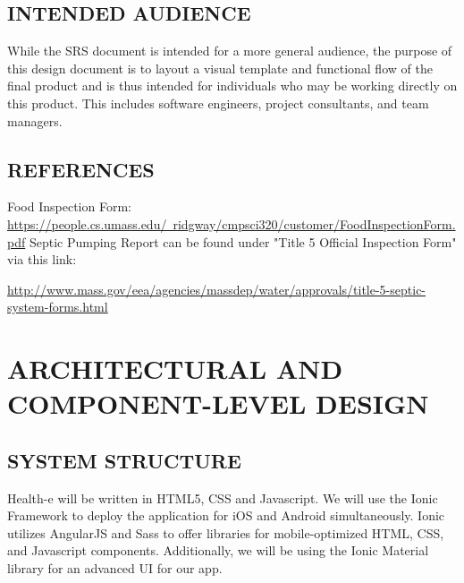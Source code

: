 \documentclass[twoside,letterpaper]{article}
\begin{document}
\subsection[INTENDED AUDIENCE]{\rmfamily\bfseries\color{black}
INTENDED AUDIENCE}
{\rmfamily\color{black}
While the SRS document is intended for a more general audience, the purpose of this design document is to layout a visual template and functional flow of the final product and is thus intended for individuals who may be working directly on this product. This includes software engineers, project consultants, and team managers.
}

\subsection[REFERENCES]{\rmfamily\bfseries\color{black}
REFERENCES}
{\rmfamily\color{black}
Food Inspection Form:
\hyperref[]{https://people.cs.umass.edu/~ridgway/cmpsci320/customer/FoodInspectionForm.pdf}
\newline
Septic Pumping Report can be found under "Title 5 Official Inspection Form" via this link:
\newline

\hyperref[]{http://www.mass.gov/eea/agencies/massdep/water/approvals/title-5-septic-system-forms.html}
}

\clearpage\section[ARCHITECTURAL AND COMPONENT-LEVEL DESIGN]{\rmfamily\bfseries\color{black}
ARCHITECTURAL AND COMPONENT-LEVEL DESIGN}
\subsection[SYSTEM STRUCTURE]{\rmfamily\bfseries\color{black}
SYSTEM STRUCTURE}
Health-e will be written in HTML5, CSS and Javascript. We will use the Ionic Framework to deploy the application for iOS and Android simultaneously. Ionic utilizes AngularJS and Sass to offer libraries for mobile-optimized HTML, CSS, and Javascript components. Additionally, we will be using the Ionic Material library for an advanced UI for our app.
\end{document}
